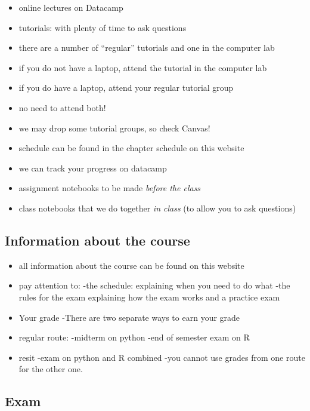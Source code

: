 \documentclass[]{book}
\providecommand{\tightlist}{%
  \setlength{\itemsep}{0pt}\setlength{\parskip}{0pt}}
\begin{document}
\begin{itemize}
\tightlist
\item
  online lectures on Datacamp
\item
  tutorials: with plenty of time to ask questions
\item
  there are a number of ``regular'' tutorials and one in the computer
  lab
\item
  if you do not have a laptop, attend the tutorial in the computer lab
\item
  if you do have a laptop, attend your regular tutorial group
\item
  no need to attend both!
\item
  we may drop some tutorial groups, so check Canvas!
\item
  schedule can be found in the chapter schedule on this website
\item
  we can track your progress on datacamp
\item
  assignment notebooks to be made \emph{before the class}
\item
  class notebooks that we do together \emph{in class} (to allow you to
  ask questions)
\end{itemize}

\subsection{Information about the
course}\label{information-about-the-course}

\begin{itemize}
\item
  all information about the course can be found on this website
\item
  pay attention to: -the schedule: explaining when you need to do what
  -the rules for the exam explaining how the exam works and a practice
  exam
\item
  Your grade -There are two separate ways to earn your grade
\item
  regular route: -midterm on python -end of semester exam on R
\item
  resit -exam on python and R combined -you cannot use grades from one
  route for the other one.
\end{itemize}

\subsection{Exam}\label{exam}
\end{document}
